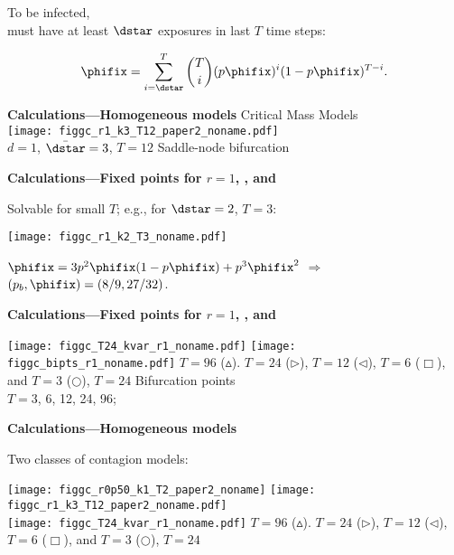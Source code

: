   To be infected,\\ must have at least $\dstar$
  exposures in last $T$ time steps:

  $$
  \phifix = 
  \sum_{i=\dstar}^{T}
  \binom{T}{i}
  (p\phifix)^{i} (1 - p\phifix)^{T-i}.
  $$


  \textbf{Calculations---Homogeneous models}
  \centering
  Critical Mass Models\\
  \texttt{[image: figgc\_r1\_k3\_T12\_paper2\_noname.pdf]}\\
  $d=1$, $\bar{\dstar}=3$, $T=12$ \hfill Saddle-node bifurcation
  


  \textbf{Calculations---Fixed points for $r = 1$, , and }

  Solvable for small $T$; e.g., for $\dstar=2$, $T=3$:

  \texttt{[image: figgc\_r1\_k2\_T3\_noname.pdf]}

 $\phifix = 3 p^2 \phifix (1 - p \phifix) + p^3 \phifix^2$
 $\Rightarrow$ $(p_b,\phifix)=(8/9,27/32)$.


 \textbf{Calculations---Fixed points for $r = 1$, , and }

\begin{center}
 \texttt{[image: figgc\_T24\_kvar\_r1\_noname.pdf]} 
 \texttt{[image: figgc\_bipts\_r1\_noname.pdf]}
 $T=96$ ($\vartriangle$).
 $T=24$ ($\triangleright$),
 $T=12$ ($\triangleleft$),
 $T=6$ ($\Box$),
 and
 $T=3$ ($\bigcirc$), 
$T=24$ \hfill Bifurcation points \\
\mbox{} \hfill $T=3$, 6, 12, 24, 96; 
 \end{center}


  \textbf{Calculations---Homogeneous models}

  \centering
  
  Two classes of contagion models:

\texttt{[image: figgc\_r0p50\_k1\_T2\_paper2\_noname]}
\hfill      
\texttt{[image: figgc\_r1\_k3\_T12\_paper2\_noname.pdf]}\\

 \texttt{[image: figgc\_T24\_kvar\_r1\_noname.pdf]}
 $T=96$ ($\vartriangle$).
 $T=24$ ($\triangleright$),
 $T=12$ ($\triangleleft$),
 $T=6$ ($\Box$),
 and
 $T=3$ ($\bigcirc$), 
 $T=24$\\

